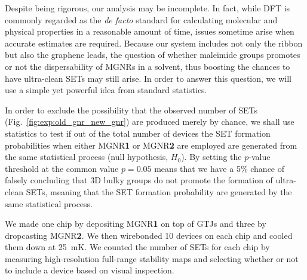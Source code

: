 Despite being rigorous, our analysis may be incomplete. In fact, while \gls{DFT} is commonly regarded as the \textit{de facto} standard for calculating molecular and physical properties in a reasonable amount of time, issues sometime arise when accurate estimates are required. Because our system includes not only the ribbon but also the graphene leads, the question of whether maleimide groups promotes or not the dispersability of \glspl{MGNR} in a solvent, thus boosting the chances to have ultra-clean \glspl{SET} may still arise. In order to answer this question, we will use a simple yet powerful idea from standard statistics.

In order to exclude the possibility that the observed number of \glspl{SET} (Fig.~\ref{fig:exp:old_gnr_new_gnr}) are produced merely by chance, we shall use statistics to test if out of the total number of devices the \gls{SET} formation probabilities when either \gls{MGNR}\textbf{1} or \gls{MGNR}\textbf{2} are employed are generated from the same statistical process (null hypothesis, $H_0$). By setting the $p$-value threshold at the common value $p=0.05$ means that we have a 5\% chance of falsely concluding that 3D bulky groups do not promote the formation of ultra-clean \glspl{SET}, meaning that the \gls{SET} formation probability are generated by the same statistical process.

We made one chip by depositing \gls{MGNR}\textbf{1} on top of \glspl{GTJ} and three by dropcasting \gls{MGNR}\textbf{2}. We then wirebonded 10 devices on each chip and cooled them down at \SI{25}{\milli\kelvin}. We counted the number of \glspl{SET} for each chip by measuring high-resolution full-range stability maps and selecting whether or not to include a device based on visual inspection.

